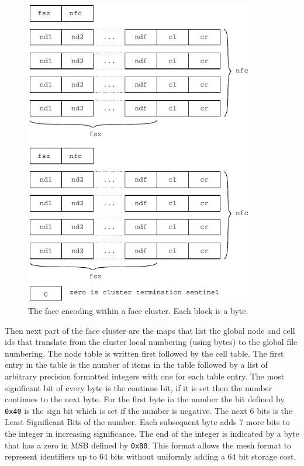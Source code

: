 \documentclass{article}
\begin{document}
\begin{figure}[htbp]
\begin{center}
  \includegraphics[width=10cm]{fcluster}
 \caption{The face encoding within a face cluster.  Each block is a byte.}
 \label{fig:clusterencoding}
\end{center}
\end{figure}


Then next part of the face cluster are the maps that list the global
node and cell ids that translate from the cluster local numbering
(using bytes) to the global file numbering.  The node table is written
first followed by the cell table.  The first entry in the table is the
number of items in the table followed by a list of arbitrary precision
formatted integers with one for each table entry.  The most
significant bit of every byte is the continue bit, if it is set then
the number continues to the next byte.  For the first byte in the
number the bit defined by {\tt 0x40} is the sign bit which is set if the
number is negative.  The next 6 bits is the Least Significant Bits of
the number.  Each subsequent byte adds 7 more bits to the integer in 
increasing significance.  The end of the integer is indicated by a byte
that has a zero in MSB defined by {\tt 0x80}.   This format allows the
mesh format to represent identifiers up to 64 bits without uniformly
adding a 64 bit storage cost.
\end{document}
